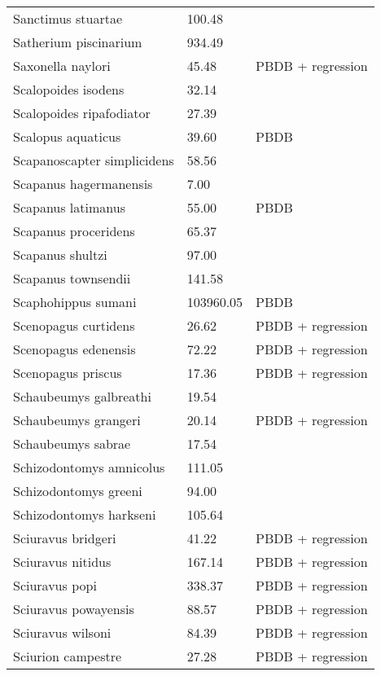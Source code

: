 \documentclass{article}
\begin{document}
\begin{center}
\begin{longtable}{p{} p{} p{}}
    Sanctimus stuartae & 100.48 & \cite{Tomiya2013} \\ 
    Satherium piscinarium & 934.49 & \cite{Tomiya2013} \\ 
    Saxonella naylori & 45.48 & PBDB + regression \\ 
    Scalopoides isodens & 32.14 & \cite{Tomiya2013} \\ 
    Scalopoides ripafodiator & 27.39 & \cite{Tomiya2013} \\ 
    Scalopus aquaticus & 39.60 & PBDB \\ 
    Scapanoscapter simplicidens & 58.56 & \cite{Tomiya2013} \\ 
    Scapanus hagermanensis & 7.00 & \cite{McKenna2011} \\ 
    Scapanus latimanus & 55.00 & PBDB \\ 
    Scapanus proceridens & 65.37 & \cite{Tomiya2013} \\ 
    Scapanus shultzi & 97.00 & \cite{McKenna2011} \\ 
    Scapanus townsendii & 141.58 & \cite{Smith2004} \\ 
    Scaphohippus sumani & 103960.05 & PBDB \\ 
    Scenopagus curtidens & 26.62 & PBDB + regression \\ 
    Scenopagus edenensis & 72.22 & PBDB + regression \\ 
    Scenopagus priscus & 17.36 & PBDB + regression \\ 
    Schaubeumys galbreathi & 19.54 & \cite{Loomis1911} \\ 
    Schaubeumys grangeri & 20.14 & PBDB + regression \\ 
    Schaubeumys sabrae & 17.54 & \cite{Matthew1901} \\ 
    Schizodontomys amnicolus & 111.05 & \cite{Tomiya2013} \\ 
    Schizodontomys greeni & 94.00 & \cite{McKenna2011} \\ 
    Schizodontomys harkseni & 105.64 & \cite{Tomiya2013} \\ 
    Sciuravus bridgeri & 41.22 & PBDB + regression \\ 
    Sciuravus nitidus & 167.14 & PBDB + regression \\ 
    Sciuravus popi & 338.37 & PBDB + regression \\ 
    Sciuravus powayensis & 88.57 & PBDB + regression \\ 
    Sciuravus wilsoni & 84.39 & PBDB + regression \\ 
    Sciurion campestre & 27.28 & PBDB + regression \\ 

\end{longtable}
\end{center}
\end{document}
